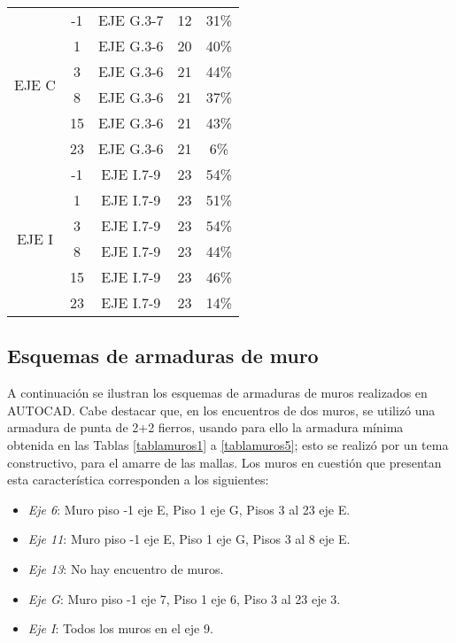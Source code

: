 \begin{table}[H]
{\begin{tabular}{ccccc}
    \hline
    \multicolumn{1}{c}{\multirow{6}[2]{*}{\begin{sideways}EJE C\end{sideways}}} & -1    & EJE G.3-7 & 12    & 31\% \bigstrut[t]\\
          & 1     & EJE G.3-6 & 20    & 40\% \\
          & 3     & EJE G.3-6 & 21    & 44\% \\
          & 8     & EJE G.3-6 & 21    & 37\% \\
          & 15    & EJE G.3-6 & 21    & 43\% \\
          & 23    & EJE G.3-6 & 21    & 6\% \bigstrut[b]\\
    \hline
    \multicolumn{1}{c}{\multirow{6}[2]{*}{\begin{sideways}EJE I\end{sideways}}} & -1    & EJE I.7-9 & 23    & 54\% \bigstrut[t]\\
          & 1     & EJE I.7-9 & 23    & 51\% \\
          & 3     & EJE I.7-9 & 23    & 54\% \\
          & 8     & EJE I.7-9 & 23    & 44\% \\
          & 15    & EJE I.7-9 & 23    & 46\% \\
          & 23    & EJE I.7-9 & 23    & 14\% \bigstrut[b]\\
    \hline
  \end{tabular}
  }
  \label{tab:rescompresion}
\end{table}

\subsection{Esquemas de armaduras de muro}

A continuación se ilustran los esquemas de armaduras de muros realizados en AUTOCAD. Cabe destacar que, en los encuentros de dos muros, se utilizó una armadura de punta de 2+2 fierros, usando para ello la armadura mínima obtenida en las Tablas \ref{tablamuros1} a \ref{tablamuros5}; esto se realizó por un tema constructivo, para el amarre de las mallas. Los muros en cuestión que presentan esta característica corresponden a los siguientes:

\begin{itemize}
    \item \textit{Eje 6}: Muro piso -1 eje E, Piso 1 eje G, Pisos 3 al 23 eje E.
    \item \textit{Eje 11}: Muro piso -1 eje E, Piso 1 eje G, Pisos 3 al 8 eje E.
    \item \textit{Eje 13}: No hay encuentro de muros.
    \item \textit{Eje G}: Muro piso -1 eje 7, Piso 1 eje 6, Piso 3 al 23 eje 3.
    \item \textit{Eje I}: Todos los muros en el eje 9.
\end{itemize}

